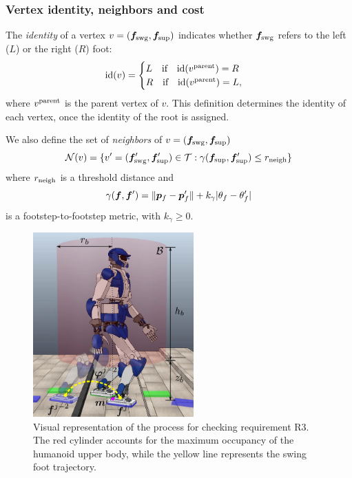 \medskip

\subsubsection{Vertex identity, neighbors and cost}
\label{sec:WoS:offlineCase:FP:CostFunctions}
The {\em identity} of a vertex $v=({\bm{f}}_{\rm swg}, {\bm{f}}_{\rm sup})$ indicates
whether  ${\bm{f}}_{\rm swg}$ refers to the left ($L$) or the right ($R$) foot:
\[
{\rm id}(v)=
\begin{cases}
L\quad \mbox{if} \quad{\rm id}(v^{\rm parent}) = R \\
R\quad \mbox{if} \quad{\rm id}(v^{\rm parent}) = L,
\end{cases}
\]
where $v^{\rm parent}$ is the parent vertex of $v$.
This definition determines the identity of each vertex, once the identity of
the root is assigned.

We also define the set of {\em neighbors} of $v=({\bm{f}}_{\rm swg}, {\bm{f}}_{\rm sup})$
\[
{\cal N}(v) = \{ v'=({\bm{f}}'_{\rm swg}, {\bm{f}}'_{\rm sup}) \in {\cal T} : 
 \gamma({\bm{f}}_{\rm sup}, {\bm{f}}'_{\rm sup}) \le r_{\rm neigh}\}
\]
where $r_{\rm neigh}$ is a threshold distance and
\begin{equation}
\gamma({\bm{f}}, {\bm{f}}') = \lVert {\bm{p}}_f - {\bm{p}}_f' \rVert + k_{\gamma}|\theta_f-\theta_f'|
\label{eq:WoS:footstepToFootstepMetric}
\end{equation}
is a footstep-to-footstep metric, with $k_{\gamma}\ge 0$.

\begin{figure}
\centering
\includegraphics[width=0.55\textwidth]{figures/R3_CollisionCheck.jpeg}
\caption{Visual representation of the process for checking requirement R3.
The red cylinder accounts for the maximum occupancy of the humanoid upper body,
while the yellow line represents the swing foot trajectory.}
\label{fig:WoS:ReqCollisionCheck}
\end{figure}

